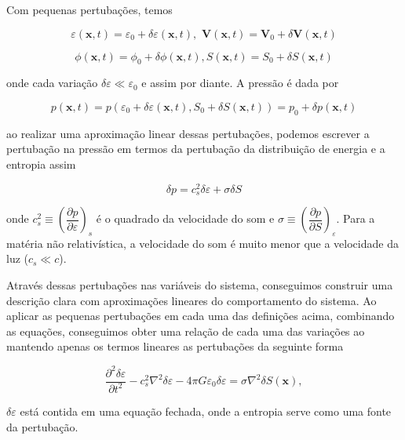 Com pequenas pertubações, temos

\begin{equation}\label{eq9}
	\varepsilon (\textbf{x},t) = \varepsilon_0 + \delta\varepsilon (\textbf{x},t),\,\, \textbf{V} (\textbf{x},t) = \textbf{V}_0 +\delta\textbf{V} (\textbf{x},t) 
\end{equation}

$$\phi (\textbf{x},t) = \phi_0 + \delta\phi (\textbf{x},t), S (\textbf{x},t)= S_0 + \delta S (\textbf{x},t)$$

onde cada variação $\delta\varepsilon \ll \varepsilon_0$ e assim por diante. A pressão é dada por

\begin{equation}\label{eq10}
	p (\textbf{x},t) = p( \varepsilon_0 + \delta\varepsilon (\textbf{x},t), S_0 + \delta S (\textbf{x},t) ) = p_0 +\delta p (\textbf{x},t) 
\end{equation}

ao realizar uma aproximação linear dessas pertubações, podemos escrever a pertubação na pressão em termos da pertubação da distribuição de energia e a entropia assim

\begin{equation}\label{eq11}
	\delta p = c_s^2\delta\varepsilon + \sigma\delta S
\end{equation}

onde $c^2_s \equiv \left(\dfrac{\partial p}{\partial\varepsilon}\right)_s$ é o quadrado da velocidade do som e $\sigma \equiv \left(\dfrac{\partial p}{\partial S}\right)_\varepsilon$. Para a matéria não relativística, a velocidade do som é muito menor que a velocidade da luz ($c_s \ll c  $).

Através dessas pertubações nas variáveis do sistema, conseguimos construir uma descrição clara com aproximações lineares do comportamento do sistema. Ao aplicar as pequenas pertubações em cada uma das definições acima, combinando as equações, conseguimos obter uma relação de cada uma das variações ao mantendo apenas os termos lineares as pertubações da seguinte forma 

\begin{equation}\label{eq12}
	\dfrac{\partial^2\delta\varepsilon}{\partial t^2} - c^2_s\nabla^2\delta\varepsilon - 4\pi G\varepsilon_0\delta\varepsilon = \sigma\nabla^2\delta S(\textbf{x}),
\end{equation}

$ \delta\varepsilon $ está contida em uma equação fechada, onde a entropia serve como uma fonte da pertubação.

